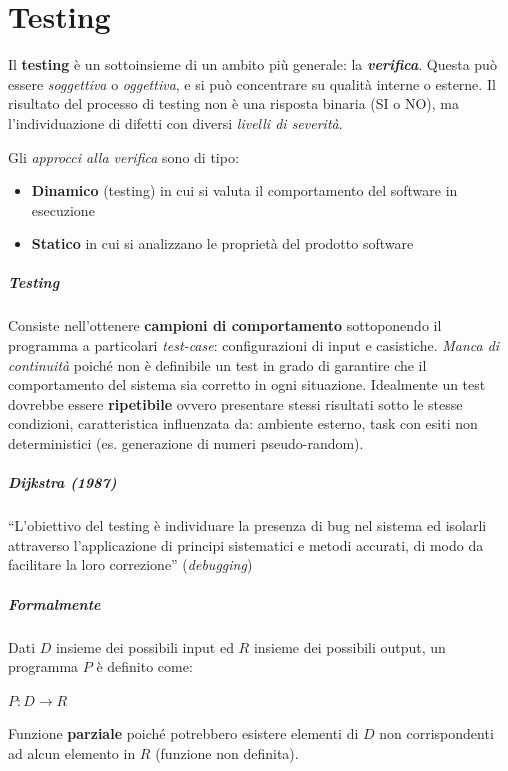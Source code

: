 \chapter{Testing}

Il \textbf{testing} è un sottoinsieme di un ambito più generale: la \textbf{\textit{verifica}}.
Questa può essere \textit{soggettiva} o \textit{oggettiva}, e si può concentrare su qualità interne o esterne. Il risultato del processo di testing non è una risposta binaria (SI o NO), ma l'individuazione di difetti con diversi \textit{livelli di severità}.


Gli \textit{approcci alla verifica} sono di tipo:
\begin{itemize}
    \item \textbf{Dinamico} (testing) in cui si valuta il comportamento del software in esecuzione
    \item \textbf{Statico} in cui si analizzano le proprietà del prodotto software
\end{itemize}

\paragraph{Testing} Consiste nell'ottenere \textbf{campioni di comportamento} sottoponendo il programma a particolari \textit{test-case}: configurazioni di input e casistiche. \textit{Manca di continuità} poiché non è definibile un test in grado di garantire che il comportamento del sistema sia corretto in ogni situazione. Idealmente un test dovrebbe essere \textbf{ripetibile} ovvero presentare stessi risultati sotto le stesse condizioni, caratteristica influenzata da: ambiente esterno, task con esiti non deterministici (es. generazione di numeri pseudo-random).

\paragraph{Dijkstra (1987)} “L'obiettivo del testing è individuare la presenza di bug nel sistema ed isolarli attraverso l'applicazione di principi sistematici e metodi accurati, di modo da facilitare la loro correzione” (\textit{debugging})

\paragraph{Formalmente} Dati $D$ insieme dei possibili input ed $R$ insieme dei possibili output, un programma $P$ è definito come:
\begin{center}
    $P : D \rightarrow R$
\end{center}
Funzione \textbf{parziale} poiché potrebbero esistere elementi di $D$ non corrispondenti ad alcun elemento in $R$ (funzione non definita).

